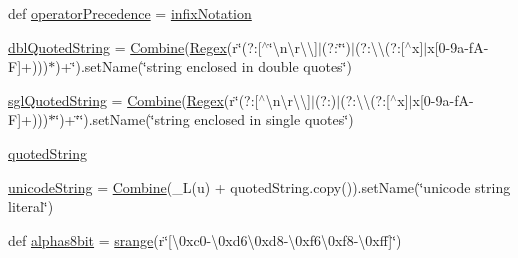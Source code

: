 \begin{DoxyCompactItemize}
def \hyperlink{namespacepkg__resources_1_1__vendor_1_1pyparsing_a3940d5fbb72a70a3fb386e41f5d02a4d}{operator\+Precedence} = \hyperlink{namespacepkg__resources_1_1__vendor_1_1pyparsing_a6984cb03a561daf44e2ee3dcdbf72fac}{infix\+Notation}
\item 
\hyperlink{namespacepkg__resources_1_1__vendor_1_1pyparsing_aa66de23ed2a70e4bf70044b2b3bcb66d}{dbl\+Quoted\+String} = \hyperlink{classpkg__resources_1_1__vendor_1_1pyparsing_1_1_combine}{Combine}(\hyperlink{classpkg__resources_1_1__vendor_1_1pyparsing_1_1_regex}{Regex}(r\textquotesingle{}\char`\"{}(?\+:\mbox{[}$^\wedge$\char`\"{}\textbackslash{}n\textbackslash{}r\textbackslash{}\textbackslash{}\mbox{]}$\vert$(?\+:\char`\"{}\char`\"{})$\vert$(?\+:\textbackslash{}\textbackslash{}(?\+:\mbox{[}$^\wedge$x\mbox{]}$\vert$x\mbox{[}0-\/9a-\/f\+A-\/\+F\mbox{]}+)))$\ast$\textquotesingle{})+\textquotesingle{}\char`\"{}\textquotesingle{}).\+set\+Name(\char`\"{}string enclosed in double quotes\char`\"{})
\item 
\hyperlink{namespacepkg__resources_1_1__vendor_1_1pyparsing_a7d5251e45488ab48b4c73533a29698f5}{sgl\+Quoted\+String} = \hyperlink{classpkg__resources_1_1__vendor_1_1pyparsing_1_1_combine}{Combine}(\hyperlink{classpkg__resources_1_1__vendor_1_1pyparsing_1_1_regex}{Regex}(r\char`\"{}\textquotesingle{}(?\+:\mbox{[}$^\wedge$\textquotesingle{}\textbackslash{}n\textbackslash{}r\textbackslash{}\textbackslash{}\mbox{]}$\vert$(?\+:\textquotesingle{}\textquotesingle{})$\vert$(?\+:\textbackslash{}\textbackslash{}(?\+:\mbox{[}$^\wedge$x\mbox{]}$\vert$x\mbox{[}0-\/9a-\/f\+A-\/\+F\mbox{]}+)))$\ast$\char`\"{})+\char`\"{}\textquotesingle{}\char`\"{}).\+set\+Name(\char`\"{}string enclosed in single quotes\char`\"{})
\item 
\hyperlink{namespacepkg__resources_1_1__vendor_1_1pyparsing_aab31d7659e67bb1bb8c21cb318926a3f}{quoted\+String}
\item 
\hyperlink{namespacepkg__resources_1_1__vendor_1_1pyparsing_a96d659aaa7b5e1beeb6c83a29459816c}{unicode\+String} = \hyperlink{classpkg__resources_1_1__vendor_1_1pyparsing_1_1_combine}{Combine}(\+\_\+L(\textquotesingle{}u\textquotesingle{}) + quoted\+String.\+copy()).set\+Name(\char`\"{}unicode string literal\char`\"{})
\item 
def \hyperlink{namespacepkg__resources_1_1__vendor_1_1pyparsing_aa5cc5b52696b4aeb467ee3f44a75a0af}{alphas8bit} = \hyperlink{namespacepkg__resources_1_1__vendor_1_1pyparsing_a027169ca2662651f3eb417e3f81e4db6}{srange}(r\char`\"{}\mbox{[}\textbackslash{}0xc0-\/\textbackslash{}0xd6\textbackslash{}0xd8-\/\textbackslash{}0xf6\textbackslash{}0xf8-\/\textbackslash{}0xff\mbox{]}\char`\"{})

\end{DoxyCompactItemize}
